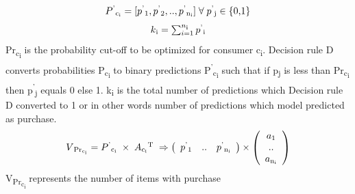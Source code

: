   \begin{equation}
    \begin{array}{l}
      P\textsuperscript{'}\textsubscript{c\textsubscript{i}} = [p\textsuperscript{'}\textsubscript{1}, 
      p\textsuperscript{'}\textsubscript{2}, .., p\textsuperscript{'}\textsubscript{n\textsubscript{i}}]\; 
      \forall \; p\textsuperscript{'}\textsubscript{j} \in \; $\{0,1\}$
    \end{array}
    \label{eqn:Pdash}
  \end{equation}
  \begin{equation}
    \begin{array}{l}
      k\textsubscript{i} =\sum_{i=1}^{n\textsubscript{i}}p\textsuperscript{'}\textsubscript{i}
    \end{array}
    \label{eqn:Pdash}
  \end{equation}
Pr\textsubscript{c\textsubscript{i}} is the probability cut-off to be optimized for consumer c\textsubscript{i}.
Decision rule D converts probabilities P\textsubscript{c\textsubscript{i}} to binary predictions 
P\textsuperscript{'}\textsubscript{c\textsubscript{i}} such that if p\textsubscript{j} is less than 
Pr\textsubscript{c\textsubscript{i}} then p\textsuperscript{'}\textsubscript{j} equals 0 else 1. 
k\textsubscript{i} is the total number of predictions which Decision rule D converted to 1 or in other words
number of predictions which model predicted as purchase.
  \begin{equation}
    \begin{array}{l}
      V\textsubscript{Pr\textsubscript{c\textsubscript{i}}} = 
      P\textsuperscript{'}\textsubscript{c\textsubscript{i}}
      \;\times\; A\textsubscript{c\textsubscript{i}}\textsuperscript{T}
      \;
      \Rightarrow	
      \left( \begin{array}{ccc}
      p\textsuperscript{'}\textsubscript{1} & .. & 
      p\textsuperscript{'}\textsubscript{n\textsubscript{i}}
      \end{array} \right)
      \times
      \left( \begin{array}{ccc}
      a\textsubscript{1} \\
      .. \\
      a\textsubscript{n\textsubscript{i}} \\
      \end{array} \right)
    \end{array}
    \label{eqn:probability}
  \end{equation}
V\textsubscript{Pr\textsubscript{c\textsubscript{i}}} represents the number of items with purchase 
